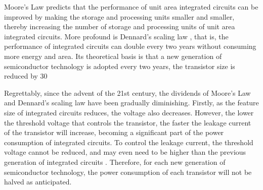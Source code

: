 Moore's Law predicts that the performance of unit area integrated circuits can be improved by making the storage and processing units smaller and smaller, thereby increasing the number of storage and processing units of unit area integrated circuits. More profound is Dennard's scaling law \cite{dennard1974design}, that is, the performance of integrated circuits can double every two years without consuming more energy and area. Its theoretical basis is that a new generation of semiconductor technology is adopted every two years, the transistor size is reduced by 30%

Regrettably, since the advent of the 21st century, the dividends of Moore's Law and Dennard's scaling law have been gradually diminishing. Firstly, as the feature size of integrated circuits reduces, the voltage also decreases. However, the lower the threshold voltage that controls the transistor, the faster the leakage current of the transistor will increase, becoming a significant part of the power consumption of integrated circuits. To control the leakage current, the threshold voltage cannot be reduced, and may even need to be higher than the previous generation of integrated circuits \cite{borkar1999design}. Therefore, for each new generation of semiconductor technology, the power consumption of each transistor will not be halved as anticipated. 

